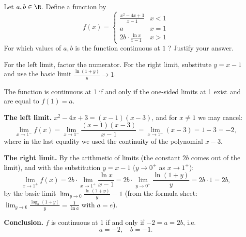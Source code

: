 
\begin{question}
Let $a,b\in\R$. Define a function by
\[
f(x)=\begin{cases}
\frac{x^2-4x+3}{x-1} & x<1\\
a & x=1\\
2b\cdot\frac{\ln x}{x-1} & x>1
\end{cases}
\]
For which values of $a,b$ is the function continuous at $1$ ? Justify your answer.
\end{question}

\begin{hint}
For the left limit, factor the numerator. For the right limit, substitute $y=x-1$ and use the basic limit $\frac{\ln(1+y)}{y}\to1$.
\end{hint}

\begin{solution}
The function is continuous at 1 if and only if the one-sided limits at 1 exist and are equal to $f(1)=a$.

\textbf{The left limit.} $x^2-4x+3=(x-1)(x-3)$, and for $x\neq1$ we may cancel:
\[
\lim_{x\to1^-}f(x)=\lim_{x\to1^-}\frac{(x-1)(x-3)}{x-1}=\lim_{x\to1^-}(x-3)=1-3=-2 ,
\]
where in the last equality we used the continuity of the polynomial $x-3$.

\textbf{The right limit.} By the arithmetic of limits (the constant $2b$ comes out of the limit), and with the substitution $y=x-1$ ($y\to0^+$ as $x\to1^+$):
\[
\lim_{x\to1^+}f(x)=2b\cdot\lim_{x\to1^+}\frac{\ln x}{x-1}=2b\cdot\lim_{y\to0^+}\frac{\ln(1+y)}{y}=2b\cdot1=2b ,
\]
by the basic limit $\lim_{y\to0}\frac{\ln(1+y)}{y}=1$ (from the formula sheet: $\lim_{y\to0}\frac{\log_a(1+y)}{y}=\frac{1}{\ln a}$ with $a=e$).

\textbf{Conclusion.} $f$ is continuous at 1 if and only if $-2=a=2b$, i.e.
\[
\boxed{a=-2,\quad b=-1.}
\]
\end{solution}
